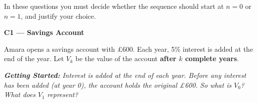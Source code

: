 \documentclass[12pt,a4paper]{article}
\newcommand{\scaffold}[1]{%
  \begin{tcolorbox}[
    colback=scaffoldgold, colframe=scaffoldborder,
    leftrule=3pt, rightrule=0pt, toprule=0pt, bottomrule=0pt,
    sharp corners, left=6pt, top=3pt, bottom=3pt, before skip=4pt
  ]
  {\small\itshape\color{brown} \textbf{Getting Started:} #1}
  \end{tcolorbox}%
}
\begin{document}
\vspace{4pt}
\noindent In these questions you must decide whether the sequence should start at $n = 0$ or $n = 1$, and justify your choice.

\bigskip

\noindent\textbf{C1 --- Savings Account}

\begin{tcolorbox}[colback=white, colframe=lightgrey, sharp corners, left=8pt, top=6pt, bottom=6pt]
Amara opens a savings account with \pounds600. Each year, 5\% interest is added at the end of the year.
Let $V_k$ be the value of the account \textbf{after $k$ complete years}.
\end{tcolorbox}

\scaffold{Interest is added \emph{at the end} of each year. Before any interest has been added (at year 0), the account holds the original \pounds600. So what is $V_0$? What does $V_1$ represent?}
\end{document}
